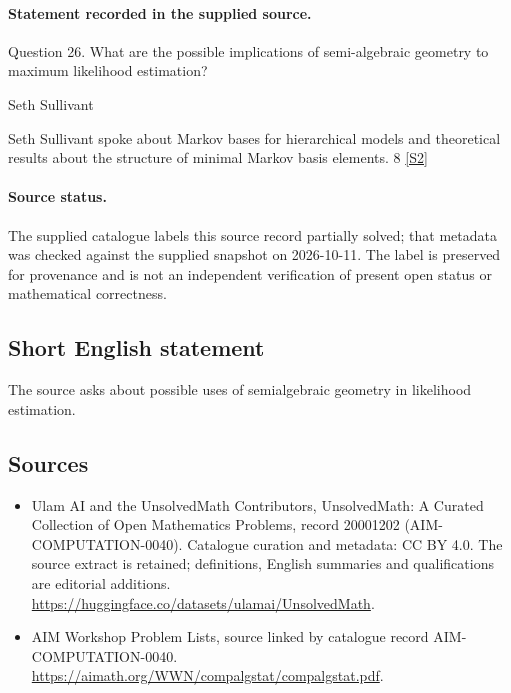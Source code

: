 \documentclass[11pt]{article}
\begin{document}
\paragraph{Statement recorded in the supplied source.}
Question 26. What are the possible implications of semi-algebraic geometry to maximum likelihood estimation?

Seth Sullivant

Seth Sullivant spoke about Markov bases for hierarchical models and theoretical results about the structure of minimal Markov basis elements. 8 \href{https://aimath.org/WWN/compalgstat/compalgstat.pdf}{[S2]}
\paragraph{Source status.}
The supplied catalogue labels this source record partially solved; that metadata was checked against the supplied snapshot on 2026-10-11. The label is preserved for provenance and is not an independent verification of present open status or mathematical correctness.
\subsection{Short English statement}
The source asks about possible uses of semialgebraic geometry in likelihood estimation.
\subsection{Sources}
\begin{itemize}
\item[S1] Ulam AI and the UnsolvedMath Contributors, UnsolvedMath: A Curated Collection of Open Mathematics Problems, record 20001202 (AIM-COMPUTATION-0040). Catalogue curation and metadata: CC BY 4.0. The source extract is retained; definitions, English summaries and qualifications are editorial additions.
\url{https://huggingface.co/datasets/ulamai/UnsolvedMath}.
\item[S2] AIM Workshop Problem Lists, source linked by catalogue record AIM-COMPUTATION-0040.
\url{https://aimath.org/WWN/compalgstat/compalgstat.pdf}.
\end{itemize}
\end{document}
